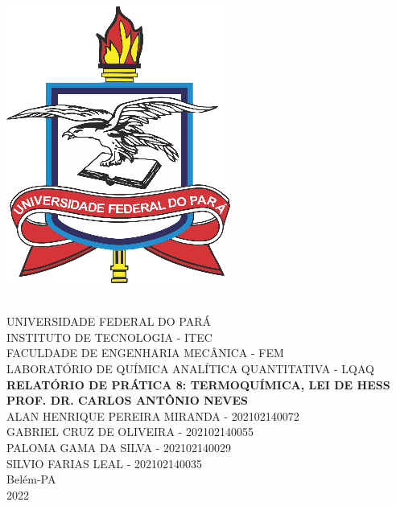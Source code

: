 \thispagestyle{empty}
    \begin{center}
        \parbox{3cm}{\includegraphics[scale=1]{pictures/logo_ufpa}}\\
        \vspace{1cm}
        \Large \uppercase{Universidade Federal do Pará}\\
        \Large \uppercase{Instituto de Tecnologia - ITEC}\\
        \vspace{3cm}
        \Large \uppercase{Faculdade de Engenharia Mecânica - FEM}\\
        \Large \uppercase{Laboratório de Química Analítica Quantitativa - LQAQ}\\
        \vspace{3cm}
        \Large \textbf{\uppercase {Relatório de Prática 8: Termoquímica, Lei de Hess}} \\
        \Large \textbf{\uppercase {PROF. DR. Carlos Antônio Neves}} \\
        \vspace{3cm}
        \Large \uppercase {Alan Henrique Pereira Miranda - 202102140072}\\
        \Large \uppercase {Gabriel Cruz de Oliveira - 202102140055}\\
        \Large \uppercase {Paloma Gama da Silva - 202102140029}\\
        \Large \uppercase {Silvio Farias Leal - 202102140035}\\
        \vspace{1cm}
        \Large {Belém-PA \\ 2022}

    \end{center}
